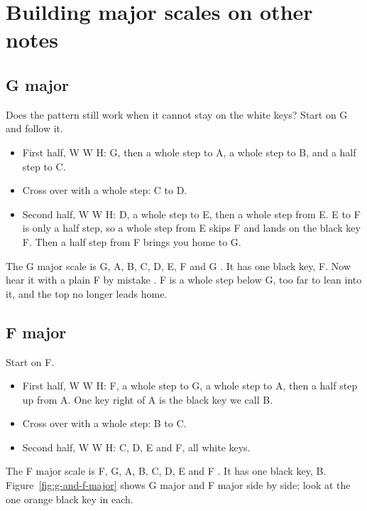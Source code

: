 \section{Building major scales on other notes}

\subsection*{G major}

Does the pattern still work when it cannot stay on the white keys? Start on G and follow it.
\begin{itemize}
  \item First half, W W H: G, then a whole step to A, a whole step to B, and a half step to C.
  \item Cross over with a whole step: C to D.
  \item Second half, W W H: D, a whole step to E, then a whole step from E. E to F is only a half step, so a whole step from E skips F and lands on the black key F\sh. Then a half step from F\sh{} brings you home to G.
\end{itemize}

The G major scale is G, A, B, C, D, E, F\sh{} and G . It has one black key, F\sh. Now hear it with a plain F by mistake . F is a whole step below G, too far to lean into it, and the top no longer leads home.

\subsection*{F major}

Start on F.
\begin{itemize}
  \item First half, W W H: F, a whole step to G, a whole step to A, then a half step up from A. One key right of A is the black key we call B\fl.
  \item Cross over with a whole step: B\fl{} to C.
  \item Second half, W W H: C, D, E and F, all white keys.
\end{itemize}

The F major scale is F, G, A, B\fl, C, D, E and F . It has one black key, B\fl. Figure~\ref{fig:g-and-f-major} shows G major and F major side by side; look at the one orange black key in each.

